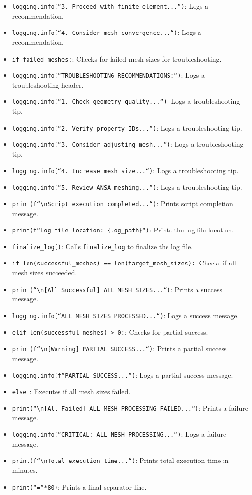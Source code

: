 \documentclass{book}
\begin{document}
\begin{itemize}[leftmargin=*,label=\textbullet]
\begin{itemize}
    \item \texttt{logging.info(``3. Proceed with finite element...``)}: Logs a recommendation.
    \item \texttt{logging.info(``4. Consider mesh convergence...``)}: Logs a recommendation.
    \item \texttt{if failed\_meshes:}: Checks for failed mesh sizes for troubleshooting.
    \item \texttt{logging.info(``TROUBLESHOOTING RECOMMENDATIONS:``)}: Logs a troubleshooting header.
    \item \texttt{logging.info(``1. Check geometry quality...``)}: Logs a troubleshooting tip.
    \item \texttt{logging.info(``2. Verify property IDs...``)}: Logs a troubleshooting tip.
    \item \texttt{logging.info(``3. Consider adjusting mesh...``)}: Logs a troubleshooting tip.
    \item \texttt{logging.info(``4. Increase mesh size...``)}: Logs a troubleshooting tip.
    \item \texttt{logging.info(``5. Review ANSA meshing...``)}: Logs a troubleshooting tip.
    \item \texttt{print(f``\textbackslash nScript execution completed...``)}: Prints script completion message.
    \item \texttt{print(f``Log file location: \{log\_path\}``)}: Prints the log file location.
    \item \texttt{finalize\_log()}: Calls \texttt{finalize\_log} to finalize the log file.
    \item \texttt{if len(successful\_meshes) == len(target\_mesh\_sizes):}: Checks if all mesh sizes succeeded.
    \item \texttt{print(``\textbackslash n[All Successful] ALL MESH SIZES...``)}: Prints a success message.
    \item \texttt{logging.info(``ALL MESH SIZES PROCESSED...``)}: Logs a success message.
    \item \texttt{elif len(successful\_meshes) > 0:}: Checks for partial success.
    \item \texttt{print(f``\textbackslash n[Warning] PARTIAL SUCCESS...``)}: Prints a partial success message.
    \item \texttt{logging.info(f``PARTIAL SUCCESS...``)}: Logs a partial success message.
    \item \texttt{else:}: Executes if all mesh sizes failed.
    \item \texttt{print(``\textbackslash n[All Failed] ALL MESH PROCESSING FAILED...``)}: Prints a failure message.
    \item \texttt{logging.info(``CRITICAL: ALL MESH PROCESSING...``)}: Logs a failure message.
    \item \texttt{print(f``\textbackslash nTotal execution time...``)}: Prints total execution time in minutes.
    \item \texttt{print(``=``*80)}: Prints a final separator line.
\end{itemize}


\end{itemize}
\end{document}
